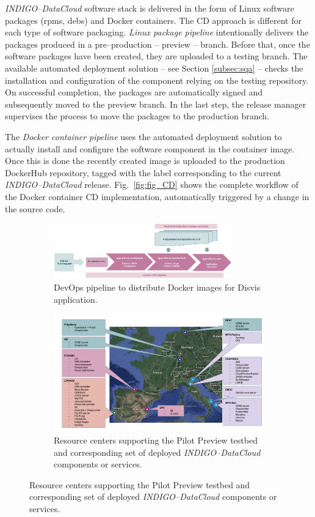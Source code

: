\documentclass[journal]{IEEEtran}
\begin{document}
{\sl INDIGO--DataCloud} software stack is delivered in the form of Linux software packages (rpms, debs)
and Docker containers. The CD approach is different for each type of software packaging. \textit{Linux
package pipeline} intentionally delivers the packages produced in a pre--production -- preview --
branch. Before that, once the software packages have been created, they are uploaded to a
testing branch. The available automated deployment solution -- see Section \ref{subsec:sqa} -- checks
the installation and configuration of the component relying on the testing repository. On
successful completion, the packages are automatically signed and subsequently moved to
the preview branch.
In the last step, the release manager supervises the process to move the  packages to the
production branch.

The \textit{Docker container pipeline} uses the automated deployment solution to
actually install and configure the software component in the container image. Once this is
done the recently created image is uploaded to the production DockerHub repository, tagged
with the label corresponding to the current {\sl INDIGO--DataCloud} release.
Fig.~\ref{fig:fig_CD} shows the complete workflow of the Docker container CD implementation,
automatically triggered by a change in the source code.

\begin{figure}
	\centering
	\begin{subfigure}
		\centering
\includegraphics[width=0.85\textwidth]{images/disvis-flow.png}
\caption{DevOps pipeline to distribute Docker images for Disvis application.}
\label{fig:fig_disvis}
	\end{subfigure}
	\quad
	\begin{subfigure}
		\centering
\includegraphics[width=\textwidth]{images/pilotpreview.png}
\caption{Resource centers supporting the Pilot Preview testbed and corresponding
set of deployed {\sl INDIGO--DataCloud} components or services.}
\label{fig:fig_pilotpreview}
	\end{subfigure}
\end{figure}
\end{document}
